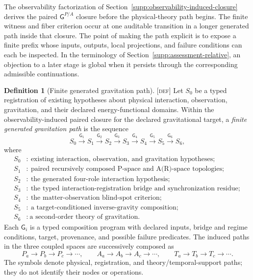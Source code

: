 \documentclass[11pt]{article}
\newcommand{\GOp}{\ensuremath{\mathsf{G}}}
\newcommand{\GPair}{\ensuremath{\mathsf{G}^{P/A}}}
\newcommand{\Defn}{\textsc{[def]}}
\theoremstyle{definition}
\newtheorem{sdefinition}{Definition}
\begin{document}
The observability factorization of
Section~\ref{supp:observability-induced-closure} derives the paired $\GPair$
closure before the physical-theory path begins. The finite witness and fiber
criterion occur at one auditable transition in a longer generated path inside that
closure. The point of making the path explicit is to expose a finite prefix whose
inputs, outputs, local projections, and failure conditions can each be inspected.
In the terminology of Section~\ref{supp:assessment-relative}, an objection to a
later stage is global when it persists through the corresponding admissible
continuations.

\begin{sdefinition}[Finite generated gravitation path]
\label{def:finite-generated-gravitation-path}
\Defn{} Let $S_0$ be a typed registration of existing hypotheses about physical
interaction, observation, gravitation, and their declared energy-functional domains.
Within the observability-induced paired closure for the declared gravitational
target, a \emph{finite generated gravitation path} is the sequence
\begin{equation}
S_0\xrightarrow{\GOp_1}S_1\xrightarrow{\GOp_2}S_2\xrightarrow{\GOp_3}S_3
\xrightarrow{\GOp_4}S_4\xrightarrow{\GOp_5}S_5\xrightarrow{\GOp_6}S_6,
\label{eq:finite-generated-gravitation-path}
\end{equation}
where
\begin{align}
S_0&:\ \text{existing interaction, observation, and gravitation hypotheses};\nonumber\\
S_1&:\ \text{paired recursively composed P-space and A(R)-space topologies};\nonumber\\
S_2&:\ \text{the generated four-role interaction hypothesis};\nonumber\\
S_3&:\ \text{the typed interaction-registration bridge and synchronization residue};\nonumber\\
S_4&:\ \text{the matter-observation blind-spot criterion};\nonumber\\
S_5&:\ \text{a target-conditioned inverse-gravity composition};\nonumber\\
S_6&:\ \text{a second-order theory of gravitation.}
\label{eq:finite-generated-gravitation-stages}
\end{align}
Each $\GOp_i$ is a typed composition program with declared inputs, bridge and
regime conditions, target, provenance, and possible failure predicates. The induced
paths in the three coupled spaces are successively composed as
\begin{equation}
P_a\rightarrow P_b\rightarrow P_c\rightarrow\cdots,\qquad
A_a\rightarrow A_b\rightarrow A_c\rightarrow\cdots,\qquad
T_a\rightarrow T_b\rightarrow T_c\rightarrow\cdots.
\label{eq:coupled-generated-paths}
\end{equation}
The symbols denote physical, registration, and theory/temporal-support paths;
they do not identify their nodes or operations.
\end{sdefinition}
\end{document}

